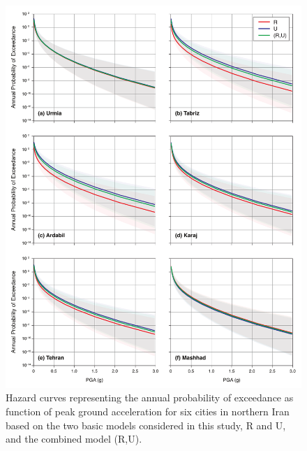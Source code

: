 \begin{figure}[th!]
    \centering
    \includegraphics[width=\textwidth]{figures/pdf/figure-11} 
    \caption{Hazard curves representing the annual probability of exceedance as function of peak ground acceleration for six cities in northern Iran based on the two basic models considered in this study, R and U, and the combined model (R,U).}
    \label{fig:hazardcurve}
\end{figure}

